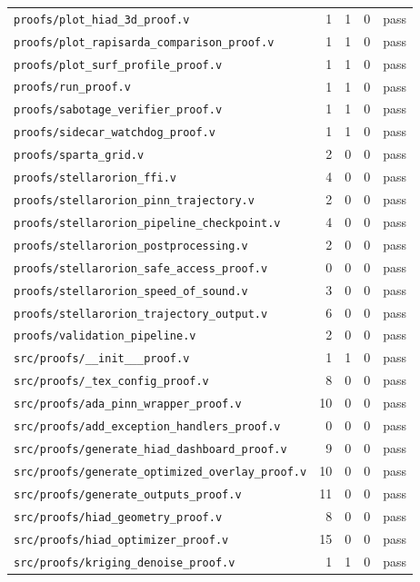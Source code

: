 \documentclass[11pt]{article}
\theoremstyle{definition}
\begin{document}
\begin{longtable}{@{}lrrrl@{}}
\texttt{proofs/plot\_hiad\_3d\_proof.v} & 1 & 1 & 0 & pass \\
\texttt{proofs/plot\_rapisarda\_comparison\_proof.v} & 1 & 1 & 0 & pass \\
\texttt{proofs/plot\_surf\_profile\_proof.v} & 1 & 1 & 0 & pass \\
\texttt{proofs/run\_proof.v} & 1 & 1 & 0 & pass \\
\texttt{proofs/sabotage\_verifier\_proof.v} & 1 & 1 & 0 & pass \\
\texttt{proofs/sidecar\_watchdog\_proof.v} & 1 & 1 & 0 & pass \\
\texttt{proofs/sparta\_grid.v} & 2 & 0 & 0 & pass \\
\texttt{proofs/stellarorion\_ffi.v} & 4 & 0 & 0 & pass \\
\texttt{proofs/stellarorion\_pinn\_trajectory.v} & 2 & 0 & 0 & pass \\
\texttt{proofs/stellarorion\_pipeline\_checkpoint.v} & 4 & 0 & 0 & pass \\
\texttt{proofs/stellarorion\_postprocessing.v} & 2 & 0 & 0 & pass \\
\texttt{proofs/stellarorion\_safe\_access\_proof.v} & 0 & 0 & 0 & pass \\
\texttt{proofs/stellarorion\_speed\_of\_sound.v} & 3 & 0 & 0 & pass \\
\texttt{proofs/stellarorion\_trajectory\_output.v} & 6 & 0 & 0 & pass \\
\texttt{proofs/validation\_pipeline.v} & 2 & 0 & 0 & pass \\
\texttt{src/proofs/\_\_init\_\_\_proof.v} & 1 & 1 & 0 & pass \\
\texttt{src/proofs/\_tex\_config\_proof.v} & 8 & 0 & 0 & pass \\
\texttt{src/proofs/ada\_pinn\_wrapper\_proof.v} & 10 & 0 & 0 & pass \\
\texttt{src/proofs/add\_exception\_handlers\_proof.v} & 0 & 0 & 0 & pass \\
\texttt{src/proofs/generate\_hiad\_dashboard\_proof.v} & 9 & 0 & 0 & pass \\
\texttt{src/proofs/generate\_optimized\_overlay\_proof.v} & 10 & 0 & 0 & pass \\
\texttt{src/proofs/generate\_outputs\_proof.v} & 11 & 0 & 0 & pass \\
\texttt{src/proofs/hiad\_geometry\_proof.v} & 8 & 0 & 0 & pass \\
\texttt{src/proofs/hiad\_optimizer\_proof.v} & 15 & 0 & 0 & pass \\
\texttt{src/proofs/kriging\_denoise\_proof.v} & 1 & 1 & 0 & pass \\

\end{longtable}
\end{document}
